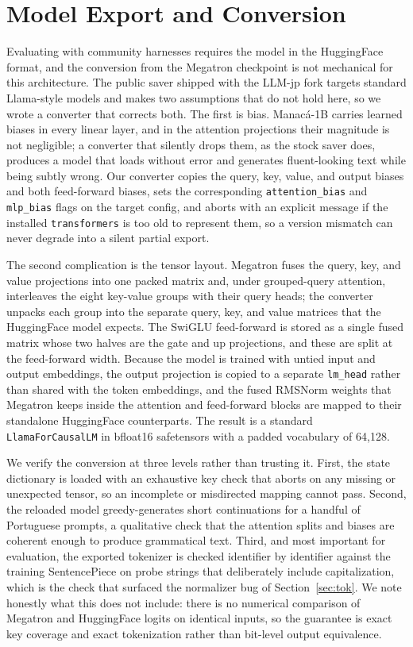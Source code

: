 \documentclass[11pt]{article}
\begin{document}
\section{Model Export and Conversion}
\label{sec:convert}

Evaluating with community harnesses requires the model in the HuggingFace format, and
the conversion from the Megatron checkpoint is not mechanical for this architecture.
The public saver shipped with the LLM-jp fork targets standard Llama-style models and
makes two assumptions that do not hold here, so we wrote a converter that corrects
both. The first is bias. Manac\'a-1B carries learned biases in every linear layer, and
in the attention projections their magnitude is not negligible; a converter that
silently drops them, as the stock saver does, produces a model that loads without
error and generates fluent-looking text while being subtly wrong. Our converter copies
the query, key, value, and output biases and both feed-forward biases, sets the
corresponding \texttt{attention\_bias} and \texttt{mlp\_bias} flags on the target
config, and aborts with an explicit message if the installed \texttt{transformers} is
too old to represent them, so a version mismatch can never degrade into a silent
partial export.

The second complication is the tensor layout. Megatron fuses the query, key, and value
projections into one packed matrix and, under grouped-query attention, interleaves the
eight key-value groups with their query heads; the converter unpacks each group into
the separate query, key, and value matrices that the HuggingFace model expects. The
SwiGLU feed-forward is stored as a single fused matrix whose two halves are the gate
and up projections, and these are split at the feed-forward width. Because the model is
trained with untied input and output embeddings, the output projection is copied to a
separate \texttt{lm\_head} rather than shared with the token embeddings, and the fused
RMSNorm weights that Megatron keeps inside the attention and feed-forward blocks are
mapped to their standalone HuggingFace counterparts. The result is a standard
\texttt{LlamaForCausalLM} in bfloat16 safetensors with a padded vocabulary of 64{,}128.

We verify the conversion at three levels rather than trusting it. First, the state
dictionary is loaded with an exhaustive key check that aborts on any missing or
unexpected tensor, so an incomplete or misdirected mapping cannot pass. Second, the
reloaded model greedy-generates short continuations for a handful of Portuguese prompts,
a qualitative check that the attention splits and biases are coherent enough to produce
grammatical text. Third, and most important for evaluation, the exported tokenizer is
checked identifier by identifier against the training SentencePiece on probe strings
that deliberately include capitalization, which is the check that surfaced the
normalizer bug of Section~\ref{sec:tok}. We note honestly what this does not include:
there is no numerical comparison of Megatron and HuggingFace logits on identical
inputs, so the guarantee is exact key coverage and exact tokenization rather than
bit-level output equivalence.
\end{document}
